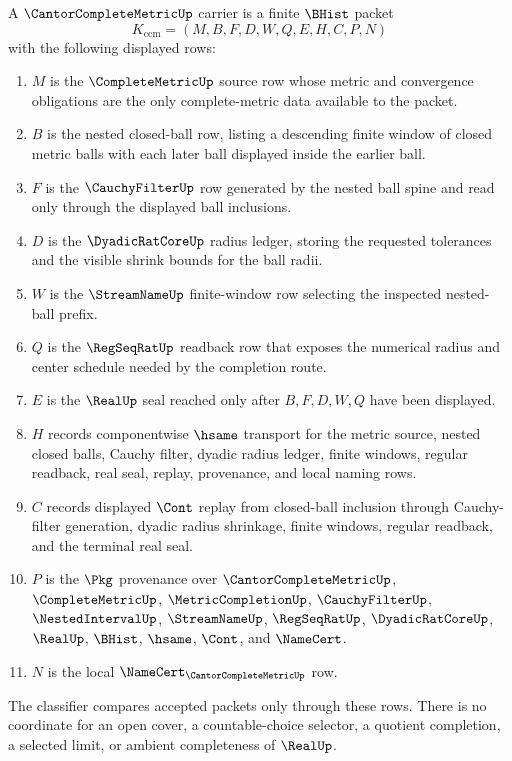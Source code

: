 \begin{definition}
\label{def:cantor-complete-metric-carrier}
A $\CantorCompleteMetricUp$ carrier is a finite $\BHist$ packet
$$
K_{\mathrm{ccm}}=(M,B,F,D,W,Q,E,H,C,P,N)
$$
with the following displayed rows:
\begin{enumerate}
\item $M$ is the $\CompleteMetricUp$ source row whose metric and convergence obligations are the only complete-metric data available to the packet.
\item $B$ is the nested closed-ball row, listing a descending finite window of closed metric balls with each later ball displayed inside the earlier ball.
\item $F$ is the $\CauchyFilterUp$ row generated by the nested ball spine and read only through the displayed ball inclusions.
\item $D$ is the $\DyadicRatCoreUp$ radius ledger, storing the requested tolerances and the visible shrink bounds for the ball radii.
\item $W$ is the $\StreamNameUp$ finite-window row selecting the inspected nested-ball prefix.
\item $Q$ is the $\RegSeqRatUp$ readback row that exposes the numerical radius and center schedule needed by the completion route.
\item $E$ is the $\RealUp$ seal reached only after $B,F,D,W,Q$ have been displayed.
\item $H$ records componentwise $\hsame$ transport for the metric source, nested closed balls, Cauchy filter, dyadic radius ledger, finite windows, regular readback, real seal, replay, provenance, and local naming rows.
\item $C$ records displayed $\Cont$ replay from closed-ball inclusion through Cauchy-filter generation, dyadic radius shrinkage, finite windows, regular readback, and the terminal real seal.
\item $P$ is the $\Pkg$ provenance over $\CantorCompleteMetricUp$, $\CompleteMetricUp$, $\MetricCompletionUp$, $\CauchyFilterUp$, $\NestedIntervalUp$, $\StreamNameUp$, $\RegSeqRatUp$, $\DyadicRatCoreUp$, $\RealUp$, $\BHist$, $\hsame$, $\Cont$, and $\NameCert$.
\item $N$ is the local $\NameCert_{\CantorCompleteMetricUp}$ row.
\end{enumerate}
The classifier compares accepted packets only through these rows. There is no coordinate for an open cover, a countable-choice selector, a quotient completion, a selected limit, or ambient completeness of $\RealUp$.
\end{definition}

